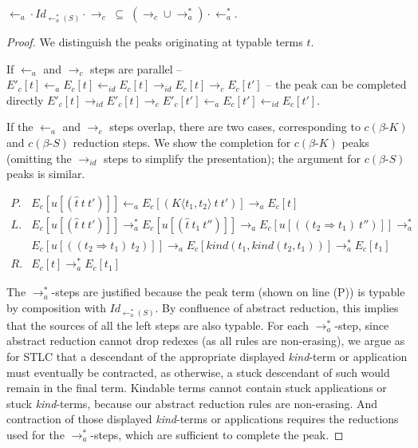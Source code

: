 \documentclass{LMCS}
\newcommand{\subse}{\; \subseteq \;}
\newcommand{\To}[0]{\Rightarrow}
\begin{document}
\begin{lem}
\label{uni-complete}
  $\leftarrow_a \cdot \textit{Id}_{\leftarrow_a^*(S)} \cdot \to_c \subse (\to_c \cup \to_a^*) \cdot \leftarrow_a^*$. 
\end{lem}


\begin{proof}
We distinguish the peaks originating at typable terms $t$. 

If $\leftarrow_a$ and $\to_c$ steps are parallel --  $E'_c[t]
\leftarrow_a E_c[t] \leftarrow_{id} E_c[t] \to_{id} E_c[t] \to_c E_c[t']$ -- the peak can be completed
directly $E'_c[t] \to_{id} E'_c[t] \to_c E'_c[t'] \leftarrow_a E_c[t']
\leftarrow_{id} E_c[t']$.

If the $\leftarrow_a$ and $\to_c$ steps overlap, there are two cases,
corresponding to $\textit{c}(\beta\textit{-K})$ and
$\textit{c}(\beta\textit{-S})$ reduction steps. We show the completion
for $\textit{c}(\beta\textit{-K})$ peaks (omitting the $\to_{id}$
steps to simplify the presentation); the argument for
$\textit{c}(\beta\textit{-S})$ peaks is similar.

\[
\begin{array}{ll}
P. & E_c[u[(\hat{t}\ t\ t')]] \leftarrow_a E_c[(K\langle t_1,t_2\rangle\ t\ t')] \to_a E_c[t]\\
L. & E_c[u[(\hat{t}\ t\ t')]] \to_a^*  E_c[u[(\hat{t}\ t_1\ t'')]] \to_a E_c[u[((t_2\To t_1)\ t'')]] \to_a^*\\
\ & E_c[u[((t_2\To t_1)\ t_2)]] \to_a E_c[\textit{kind}(t_1,\textit{kind}(t_2,t_1))] \to_a^* E_c[t_1] \\
R. & E_c[t] \to_a^*  E_c[t_1]
\end{array}
\]

\noindent The $\to_a^*$-steps are justified because the peak term
(shown on line (P)) is typable by composition with $\textit{Id}_{\leftarrow_a^*(S)}$.  By confluence of
abstract reduction, this implies that the sources of all the left
steps are also typable.  For each $\to_a^*$-step, since abstract
reduction cannot drop redexes (as all rules are non-erasing), we argue
as for STLC that a descendant of the appropriate displayed
\textit{kind}-term or application must eventually be contracted, as
otherwise, a stuck descendant of such would remain in the final term.
Kindable terms cannot contain stuck applications or stuck
\textit{kind}-terms, because our abstract reduction rules are
non-erasing.  And contraction of those displayed \textit{kind}-terms
or applications requires the reductions used for the $\to_a^*$-steps,
which are sufficient to complete the peak.
\end{proof}
\end{document}
